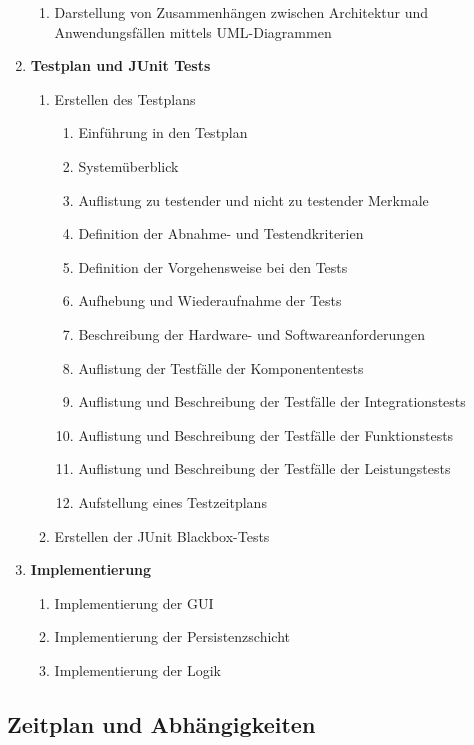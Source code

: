 \documentclass[fontsize=12pt,paper=a4,twoside]{scrartcl}
\begin{document}
\begin{enumerate}
\begin{enumerate}[label={(\arabic*)}]
	\item Darstellung von Zusammenhängen zwischen Architektur und Anwendungsfällen mittels UML-Diagrammen
	\end{enumerate}
\item \textbf{Testplan und JUnit Tests}
		\begin{enumerate}[label={(\arabic*)}]
		\item Erstellen des Testplans
			\begin{enumerate}[label={(\arabic*)}]
			\item Einführung in den Testplan
			\item Systemüberblick
			\item Auflistung zu testender und nicht zu testender Merkmale
			\item Definition der Abnahme- und Testendkriterien
			\item Definition der Vorgehensweise bei den Tests
			\item Aufhebung und Wiederaufnahme der Tests
			\item Beschreibung der Hardware- und Softwareanforderungen
			\item Auflistung der Testfälle der Komponententests
			\item Auflistung und Beschreibung der Testfälle der Integrationstests
			\item Auflistung und Beschreibung der Testfälle der Funktionstests
			\item Auflistung und Beschreibung der Testfälle der Leistungstests
			\item Aufstellung eines Testzeitplans
			\end{enumerate}
		\item Erstellen der JUnit Blackbox-Tests
		\end{enumerate}
\item \textbf{Implementierung}
		\begin{enumerate}[label={(\arabic*)}]
		\item Implementierung der GUI
		\item Implementierung der Persistenzschicht
		\item Implementierung der Logik
		\end{enumerate}	
\end{enumerate}

\subsection{Zeitplan und Abhängigkeiten}

\end{document}
